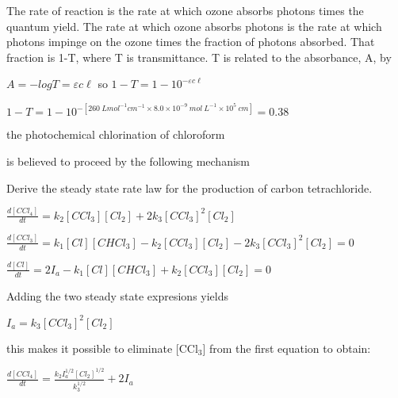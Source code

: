 \documentclass[ignorenonframetext]{beamer}
\begin{document}
\begin{Answer}[ref= ex1] The rate of reaction is the rate at which ozone absorbs photons times the quantum yield. The rate at which ozone absorbs photons is the rate at which photons impinge on the ozone times the fraction of photons absorbed. That fraction is 1-T, where T is transmittance. T is related to the absorbance, A, by

\(A=-logT = \varepsilon c \ell\) so \(1-T = 1-10^{-\varepsilon c \ell}\)

\(1-T = 1-10^{-[260\ Lmol^{-1}cm^{-1} \times 8.0\times10^{-9}\ mol\ L^{-1} \times 10^5\ cm]} = 0.38\)

\end{Answer}

\begin{Exercise}[label=ex2]
the photochemical chlorination of chloroform


is believed to proceed by the following mechanism





Derive the steady state rate law for the production of carbon tetrachloride.
\end{Exercise}

\begin{Answer}[ref=ex2]
\(\frac{d[CCl_4]}{dt} = k_2[CCl_3][Cl_2] + 2k_3[CCl_3]^2[Cl_2]\)

\(\frac{d[CCl_3]}{dt} = k_1[Cl][CHCl_3] - k_2[CCl_3][Cl_2] - 2k_3[CCl_3]^2[Cl_2] = 0\)

\(\frac{d[Cl]}{dt} = 2I_a - k_1[Cl][CHCl_3] + k_2[CCl_3][Cl_2] = 0\)

Adding the two steady state expresions yields

\(I_a = k_3[CCl_3]^2[Cl_2]\)

this makes it possible to eliminate [CCl\(_3\)] from the first equation to obtain:

\(\frac{d[CCl_4]}{dt} = \frac{k_2I_a^{1/2}[Cl_2]^{1/2}}{k_3^{1/2}} + 2I_a\)
\end{Answer}



\begin{frame}
\end{frame}
\end{document}
